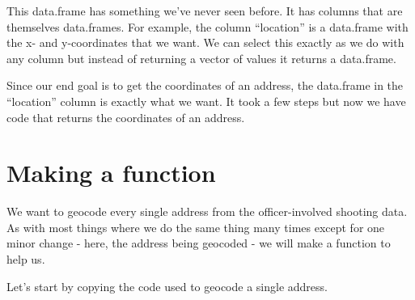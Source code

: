 \documentclass[
  12pt,
]{book}
\newenvironment{Shaded}{\begin{snugshade}}{\end{snugshade}}
\newcommand{\CommentTok}[1]{\textcolor[rgb]{0.37,0.37,0.37}{\textit{#1}}}
\newcommand{\DecValTok}[1]{\textcolor[rgb]{0.06,0.06,0.06}{#1}}
\newcommand{\FunctionTok}[1]{\textcolor[rgb]{0,0,0}{#1}}
\newcommand{\NormalTok}[1]{#1}
\newcommand{\OtherTok}[1]{\textcolor[rgb]{0.37,0.37,0.37}{#1}}
\newcommand{\SpecialCharTok}[1]{\textcolor[rgb]{0,0,0}{#1}}
\newcommand{\StringTok}[1]{\textcolor[rgb]{0.5,0.5,0.5}{#1}}
\begin{document}
This data.frame has something we've never seen before. It has columns that are themselves data.frames. For example, the column ``location'' is a data.frame with the x- and y-coordinates that we want. We can select this exactly as we do with any column but instead of returning a vector of values it returns a data.frame.

\begin{Shaded}
\end{Shaded}

Since our end goal is to get the coordinates of an address, the data.frame in the ``location'' column is exactly what we want. It took a few steps but now we have code that returns the coordinates of an address.

\hypertarget{making-a-function-1}{%
\section{Making a function}\label{making-a-function-1}}

We want to geocode every single address from the officer-involved shooting data. As with most things where we do the same thing many times except for one minor change - here, the address being geocoded - we will make a function to help us.

Let's start by copying the code used to geocode a single address.

\begin{Shaded}
\end{Shaded}
\end{document}
